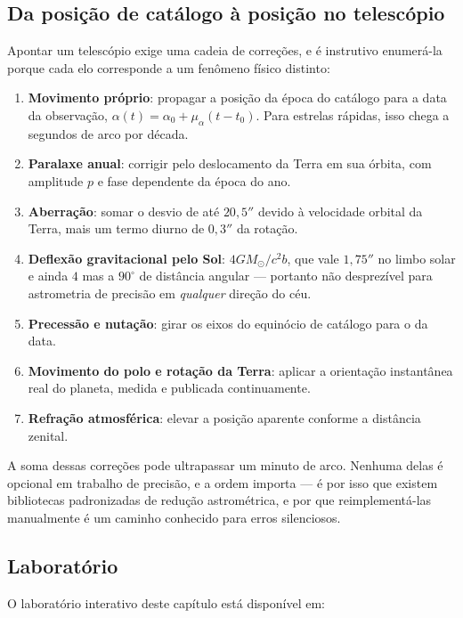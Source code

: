 \documentclass[11pt,a4paper]{article}
\begin{document}
\subsection*{Da posição de catálogo à posição no telescópio}

Apontar um telescópio exige uma cadeia de correções, e é instrutivo enumerá-la porque cada elo corresponde a um fenômeno físico distinto:

\begin{enumerate}
\item \textbf{Movimento próprio}: propagar a posição da época do catálogo para a data da observação, $\alpha(t)=\alpha_0+\mu_\alpha(t-t_0)$. Para estrelas rápidas, isso chega a segundos de arco por década.
\item \textbf{Paralaxe anual}: corrigir pelo deslocamento da Terra em sua órbita, com amplitude $p$ e fase dependente da época do ano.
\item \textbf{Aberração}: somar o desvio de até $20{,}5''$ devido à velocidade orbital da Terra, mais um termo diurno de $0{,}3''$ da rotação.
\item \textbf{Deflexão gravitacional pelo Sol}: $4GM_\odot/c^{2}b$, que vale $1{,}75''$ no limbo solar e ainda $4$ mas a $90^\circ$ de distância angular --- portanto não desprezível para astrometria de precisão em \emph{qualquer} direção do céu.
\item \textbf{Precessão e nutação}: girar os eixos do equinócio de catálogo para o da data.
\item \textbf{Movimento do polo e rotação da Terra}: aplicar a orientação instantânea real do planeta, medida e publicada continuamente.
\item \textbf{Refração atmosférica}: elevar a posição aparente conforme a distância zenital.
\end{enumerate}

A soma dessas correções pode ultrapassar um minuto de arco. Nenhuma delas é opcional em trabalho de precisão, e a ordem importa --- é por isso que existem bibliotecas padronizadas de redução astrométrica, e por que reimplementá-las manualmente é um caminho conhecido para erros silenciosos.

\subsection*{Laboratório}
O laboratório interativo deste capítulo está disponível em:
\end{document}
